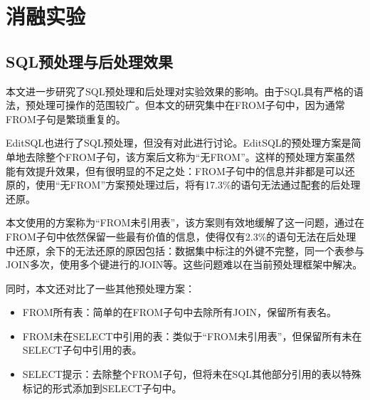 \section{消融实验}

\subsection{SQL预处理与后处理效果}

本文进一步研究了SQL预处理和后处理对实验效果的影响。由于SQL具有严格的语法，预处理可操作的范围较广。但本文的研究集中在FROM子句中，因为通常FROM子句是繁琐重复的。

EditSQL也进行了SQL预处理，但没有对此进行讨论。EditSQL的预处理方案是简单地去除整个FROM子句，该方案后文称为“无FROM”。这样的预处理方案虽然能有效提升效果，但有很明显的不足之处：FROM子句中的信息并非都是可以还原的，使用“无FROM”方案预处理过后，将有17.3\%的语句无法通过配套的后处理还原。

本文使用的方案称为“FROM未引用表”，该方案则有效地缓解了这一问题，通过在FROM子句中依然保留一些最有价值的信息，使得仅有2.3\%的语句无法在后处理中还原，余下的无法还原的原因包括：数据集中标注的外键不完整，同一个表参与JOIN多次，使用多个键进行的JOIN等。这些问题难以在当前预处理框架中解决。

同时，本文还对比了一些其他预处理方案：
\begin{itemize}
    \item FROM所有表：简单的在FROM子句中去除所有JOIN，保留所有表名。
    \item FROM未在SELECT中引用的表：类似于“FROM未引用表”，但保留所有未在SELECT子句中引用的表。
    \item SELECT提示：去除整个FROM子句，但将未在SQL其他部分引用的表以特殊标记的形式添加到SELECT子句中。
\end{itemize}

